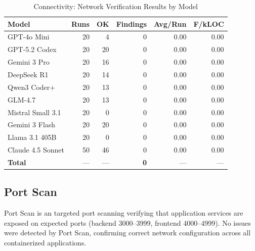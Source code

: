 \begin{table}[htbp]
    \centering
    \caption{Connectivity: Network Verification Results by Model}
    \label{tab:tool_connectivity}
    \small
    \begin{tabular}{@{} l r r r r r @{}}
        \toprule
        \textbf{Model} & \textbf{Runs} & \textbf{OK} & \textbf{Findings} & \textbf{Avg/Run} & \textbf{F/kLOC} \\
        \midrule
        GPT-4o Mini & 20 & 4 & 0 & 0.00 & 0.00 \\
        GPT-5.2 Codex & 20 & 20 & 0 & 0.00 & 0.00 \\
        Gemini 3 Pro & 20 & 16 & 0 & 0.00 & 0.00 \\
        DeepSeek R1 & 20 & 14 & 0 & 0.00 & 0.00 \\
        Qwen3 Coder+ & 20 & 13 & 0 & 0.00 & 0.00 \\
        GLM-4.7 & 20 & 13 & 0 & 0.00 & 0.00 \\
        Mistral Small 3.1 & 20 & 0 & 0 & 0.00 & 0.00 \\
        Gemini 3 Flash & 20 & 20 & 0 & 0.00 & 0.00 \\
        Llama 3.1 405B & 20 & 0 & 0 & 0.00 & 0.00 \\
        Claude 4.5 Sonnet & 50 & 46 & 0 & 0.00 & 0.00 \\
        \midrule
        \textbf{Total} & --- & --- & \textbf{0} & --- & --- \\
        \bottomrule
    \end{tabular}
\end{table}

\subsection{Port Scan}

Port Scan is an targeted port scanning verifying that application services are exposed on expected ports (backend 3000--3999, frontend 4000--4999).
 No issues were detected by Port Scan, confirming correct network configuration across all containerized applications.

